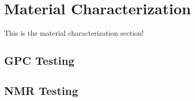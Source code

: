\newpage
\section{Material Characterization\label{methedology:materialCharacterization}}
This is the material characterization section!

\subsection{GPC Testing\label{sec:methedology:gpcTesting}}

\subsection{NMR Testing\label{sec:methedology:nmrTesting}}
